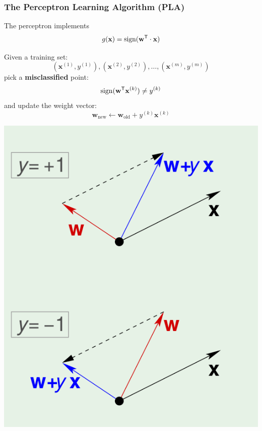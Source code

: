 \documentclass[xcolor=table]{beamer}
\newcommand{\vect}[1]{\ensuremath{\mathbf{#1}}}
\newcommand{\trans}[1]{\ensuremath{#1}^{\footnotesize{\textsf{T}}}}
\DeclareMathOperator{\sign}{sign}
\begin{document}
\begin{frame}[t]
\frametitle{The Perceptron Learning Algorithm (PLA)}
The perceptron implements 
\[g(\vect{x}) = \sign(\trans{\vect{w}} \cdot \vect{x})\]

\parbox[t]{5cm}{
Given a training set: 
\[(\vect{x}^{(1)}, y^{(1)}), (\vect{x}^{(2)}, y^{(2)}), \ldots, (\vect{x}^{(m)},
y^{(m)})\]
pick a \textbf{misclassified} point:
\[
    \sign (\trans{\vect{w}} \vect{x}^{(k)}) \neq y^{(k)}
\]
and update the weight vector:
\[
    \vect{w}_{\text{new}} \leftarrow \vect{w}_{\text{old}} + y^{(k)} \vect{x}^{(k)}
\]
} 
\hfill
\parbox[t]{5cm}{
\begin{center}
    \includegraphics[scale=0.20]{PLA.png}
\end{center}
}
\end{frame}
\end{document}
